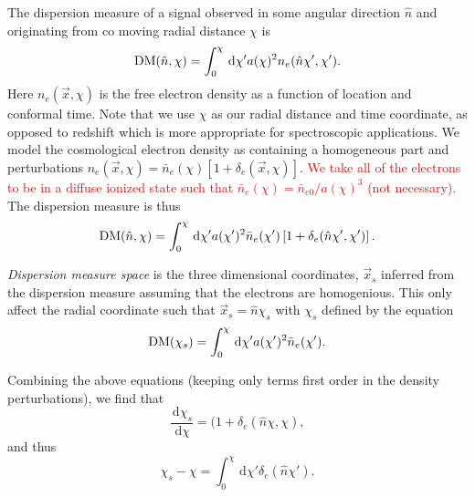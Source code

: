 \documentclass[twocolumn,prl,nofootinbib]{revtex4-1}
\newcommand{\ud}{\,\mathrm{d}}
\newcommand{\red}{\textcolor{red}}
\begin{document}
The dispersion measure of a signal observed in some angular direction $\hat{n}$ and
originating from co moving radial distance $\chi$ is
\begin{equation}
    {\rm DM}(\hat{n}, \chi) = \int_0^{\chi} \ud\chi' a(\chi)^2
        n_e(\hat{n}\chi', \chi').
\end{equation}
Here
$n_e(\vec{x}, \chi)$ is the free electron density as a function of location and
conformal time. Note that we use $\chi$ as our radial distance and time
coordinate, as opposed to redshift which is more appropriate for spectroscopic
applications. We model the cosmological 
electron density as containing a homogeneous part
and perturbations
$n_e(\vec x, \chi) = \bar{n}_e(\chi) \left[1 + \delta_e(\vec x, \chi)\right]$.  \red{We take
all of the electrons to be in a diffuse ionized state such that
$\bar{n}_e(\chi) = \bar{n}_{e0} / a(\chi)^3$ (not necessary).} The dispersion
measure is thus
\begin{equation}
    {\rm DM}(\hat n, \chi) = \int_0^\chi \ud\chi' a(\chi')^2 \bar{n}_e(\chi')
       \left[1 + \delta_e(\hat{n}\chi',\chi')\right].
\end{equation}

\emph{Dispersion measure space} is the three dimensional coordinates,
$\vec x_s$ inferred from the dispersion measure assuming that the electrons are
homogenious. This only affect the radial coordinate such that $\vec x_s = \hat
n \chi_s$ with $\chi_s$ defined by the equation
\begin{equation}
    {\rm DM}(\chi_s) = \int_0^\chi \ud\chi' a(\chi')^2 \bar{n}_e(\chi').
\end{equation}

Combining the above equations (keeping only terms first order in the density
perturbations), we find that
\begin{equation}
\frac{\ud \chi_s}{\ud \chi} = (1 + \delta_e(\hat n \chi, \chi),
\end{equation}
and thus
\begin{equation}
\chi_s - \chi = \int_0^\chi \ud \chi' \delta_e(\hat n \chi').
\end{equation}
\end{document}

